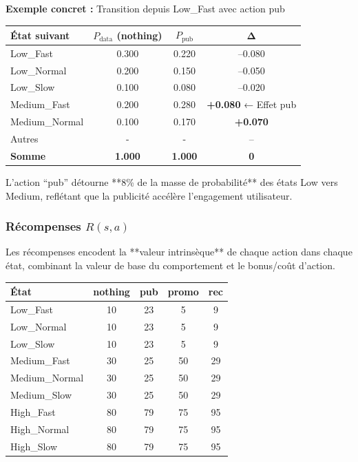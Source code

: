 \documentclass[11pt,a4paper]{article}
\renewcommand{\arraystretch}{1.35}
\begin{document}
\textbf{Exemple concret :} Transition depuis Low\_Fast avec action pub
 
\begin{center}
\renewcommand{\arraystretch}{1.3}
\begin{tabular}{l|cc|c}
\toprule
\textbf{État suivant} & $P_{\text{data}}$ (nothing) & $P_{\text{pub}}$ & \textbf{Δ} \\
\midrule
\rowcolor{LightBlue}
Low\_Fast & 0.300 & 0.220 & --0.080 \\
\rowcolor{LightBlue}
Low\_Normal & 0.200 & 0.150 & --0.050 \\
\rowcolor{LightBlue}
Low\_Slow & 0.100 & 0.080 & --0.020 \\
\rowcolor{LightOrange}
Medium\_Fast & 0.200 & 0.280 & \textbf{+0.080} ← Effet pub \\
\rowcolor{LightOrange}
Medium\_Normal & 0.100 & 0.170 & \textbf{+0.070} \\
\rowcolor{LightRed}
Autres & - & - & -- \\
\midrule
\textbf{Somme} & \textbf{1.000} & \textbf{1.000} & \textbf{0} \\
\bottomrule
\end{tabular}
\end{center}
 
L'action ``pub'' détourne **8\% de la masse de probabilité** des états Low vers Medium,
reflétant que la publicité accélère l'engagement utilisateur.
 
\subsubsection{Récompenses $R(s,a)$}
 
Les récompenses encodent la **valeur intrinsèque** de chaque action dans chaque état,
combinant la valeur de base du comportement et le bonus/coût d'action.
 
\begin{center}
\renewcommand{\arraystretch}{1.4}
\begin{tabular}{l|cccc}
\toprule
\textbf{État} & \textbf{nothing} & \textbf{pub} & \textbf{promo} & \textbf{rec} \\
\midrule
\rowcolor{LightBlue}
Low\_Fast & 10 & 23 & 5 & 9 \\
Low\_Normal & 10 & 23 & 5 & 9 \\
Low\_Slow & 10 & 23 & 5 & 9 \\
\rowcolor{LightOrange}
Medium\_Fast & 30 & 25 & 50 & 29 \\
Medium\_Normal & 30 & 25 & 50 & 29 \\
Medium\_Slow & 30 & 25 & 50 & 29 \\
\rowcolor{LightRed}
High\_Fast & 80 & 79 & 75 & 95 \\
High\_Normal & 80 & 79 & 75 & 95 \\
High\_Slow & 80 & 79 & 75 & 95 \\
\bottomrule
\end{tabular}
\end{center}
 
\end{document}
